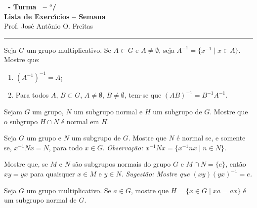 \documentclass[12pt]{exam}
\begin{document}
\begin{center}
    
    {\Large\bf \disciplina\ - Turma \turma\ -- \semestre$^{o}$/\ano} \\ \vspace{9pt} {\large\bf
        Lista de Exerc{\'\i}cios -- Semana \numerosemana}\\ \vspace{9pt} Prof. Jos{\'e} Ant{\^o}nio O. Freitas
    \end{center}
    \hrule

    \vspace{.6cm}

    \questao{} Seja $G$ um grupo multiplicativo. Se $A \subset G$ e $A \ne \emptyset$, seja $A^{-1} = \{x^{-1} \mid x \in A\}$. Mostre que:
    \begin{enumerate}[label=({\alph*})]
      \item $(A^{-1})^{-1} = A$;

      \item Para todos $A$, $B \subset G$, $A \ne \emptyset$, $B \ne \emptyset$, tem-se que $(AB)^{-1} = B^{-1}A^{-1}$.
    \end{enumerate}
    
    \vspace{.3cm}

    \questao{} Sejam $G$ um grupo, $N$ um subgrupo normal e $H$ um subgrupo de $G$. Mostre que o subgrupo $H \cap N$ é normal em $H$.

    \vspace{.3cm}

    \questao{} Seja $G$ um grupo e $N$ um subgrupo de $G$. Mostre que $N$ é normal se, e somente se, $x^{-1}Nx = N$, para todo $x \in G$.
    \noindent\textit{Observação: $x^{-1}Nx = \{x^{-1}nx \mid n \in N\}$}.

    \vspace{.3cm}

    \questao{} Mostre que, se $M$ e $N$ são subgrupos normais do grupo $G$ e $M \cap N = \{e\}$, então $xy = yx$ para quaisquer $x \in M$ e $y \in N$.
    \noindent \textit{Sugestão: Mostre que $(xy)(yx)^{-1} = e$.}

    \vspace{.3cm}

    \questao{} Seja $G$   um grupo multiplicativo. Se $a \in G$, mostre que $H = \{x \in G \mid xa = ax\}$ é um subgrupo normal de $G$.

    \vspace{.3cm}
\end{document}
